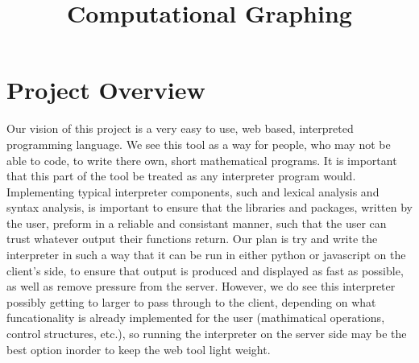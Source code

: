\documentclass{article}
\title{Computational Graphing}
\begin{document}
    
	

	\newpage

	\section{Project Overview}

	Our vision of this project is a very easy to use, web based, interpreted programming language. We see this tool as a way for people, 
    who may not be able to code, to write there own, short mathematical programs. It is important that this part of the tool be treated as
    any interpreter program would. Implementing typical interpreter components, such and lexical analysis and syntax analysis, is important
    to ensure that the libraries and packages, written by the user, preform in a reliable and consistant manner, such that the user can 
    trust whatever output their functions return. Our plan is try and write the interpreter in such a way that it can be run in either python
    or javascript on the client's side, to ensure that output is produced and displayed as fast as possible, as well as remove pressure 
    from the server. However, we do see this interpreter possibly getting to larger to pass through to the client, depending on what 
    funcationality is already implemented for the user (mathimatical operations, control structures, etc.), so running the interpreter on the
    server side may be the best option inorder to keep the web tool light weight. \par
\end{document}
